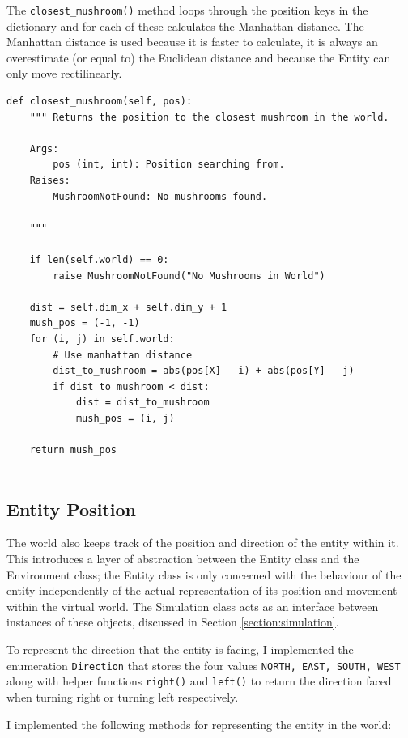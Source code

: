 \documentclass[12pt,a4paper,twoside,openright]{report}
\renewcommand{\baselinestretch}{1.1}    %
\begin{document}
The \texttt{closest\_mushroom()} method loops through the position keys in the dictionary and for each of these calculates the Manhattan distance. The Manhattan distance is used because it is faster to calculate, it is always an overestimate (or equal to) the Euclidean distance and because the Entity can only move rectilinearly. 

{\renewcommand{\baselinestretch}{0.8}\small
\begin{verbatim}
def closest_mushroom(self, pos):
    """ Returns the position to the closest mushroom in the world.
    
    Args:
        pos (int, int): Position searching from.
    Raises:
        MushroomNotFound: No mushrooms found.

    """

    if len(self.world) == 0:
        raise MushroomNotFound("No Mushrooms in World")
        
    dist = self.dim_x + self.dim_y + 1
    mush_pos = (-1, -1)
    for (i, j) in self.world:
        # Use manhattan distance
        dist_to_mushroom = abs(pos[X] - i) + abs(pos[Y] - j)
        if dist_to_mushroom < dist:
            dist = dist_to_mushroom
            mush_pos = (i, j)

    return mush_pos
	
\end{verbatim}
}

\subsection{Entity Position}

The world also keeps track of the position and direction of the entity within it. This introduces a layer of abstraction between the Entity class and the Environment class; the Entity class is only concerned with the behaviour of the entity independently of the actual representation of its position and movement within the virtual world. The Simulation class acts as an interface between instances of these objects, discussed in Section \ref{section:simulation}.

To represent the direction that the entity is facing, I implemented the enumeration \texttt{Direction} that stores the four values \texttt{NORTH, EAST, SOUTH, WEST} along with helper functions \texttt{right()} and \texttt{left()} to return the direction faced when turning right or turning left respectively.

I implemented the following methods for representing the entity in the world:
\end{document}
